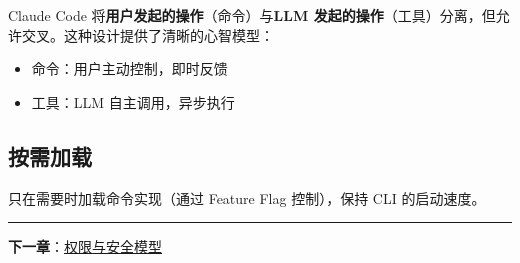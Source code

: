 Claude Code 将\textbf{用户发起的操作}（命令）与\textbf{LLM 发起的操作}（工具）分离，但允许交叉。这种设计提供了清晰的心智模型：
\begin{itemize}[nosep]
  \item 命令：用户主动控制，即时反馈
  \item 工具：LLM 自主调用，异步执行
\end{itemize}

\subsection{按需加载}

只在需要时加载命令实现（通过 Feature Flag 控制），保持 CLI 的启动速度。

\bigskip\noindent\rule{\textwidth}{0.4pt}\bigskip

\textbf{下一章}：\href{./chapter-08-permissions.md}{权限与安全模型}
